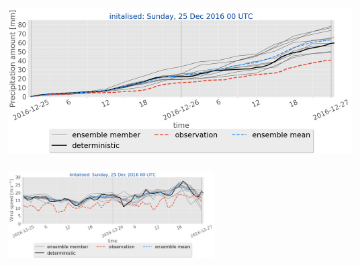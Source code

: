 \begin{figure}[h!]
    \begin{subfigure}[b]{0.49\textwidth}
    	\includegraphics[trim={0.cm 3.6cm 0cm 0cm},clip,
    width=\textwidth]{./fig_sfc_precip/20161225_00}
    	\caption{}\label{fig:res:sfc_precip25}
    \end{subfigure}
    
    \begin{subfigure}[b]{\textwidth}
    \centering
 		\includegraphics[trim={5.5cm 0cm 5.cm 17.2cm},clip,
    width=0.6\textwidth]{./fig_sfc_ws/20161225_00}
    \end{subfigure}
\end{figure}
